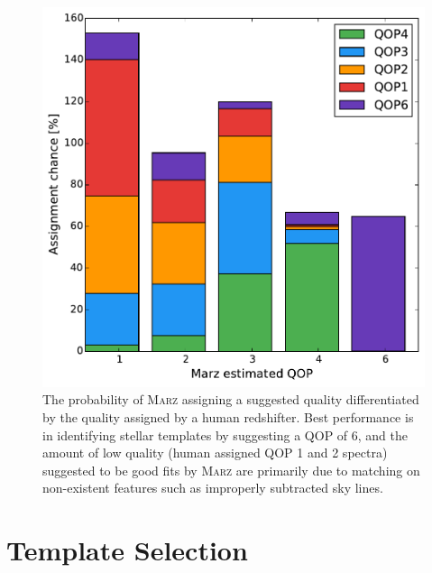 \documentclass[iop]{emulateapj}
\newcommand{\marz}{\textsc{Marz}}
\begin{document}
\begin{figure}[h]
\centering
\includegraphics[width=\columnwidth]{autoqop.pdf}
\caption{The probability of \marz{} assigning a suggested quality differentiated by the quality assigned by a human redshifter. Best performance is in identifying stellar templates by suggesting a QOP of 6, and the amount of low quality (human assigned QOP 1 and 2 spectra) suggested to be good fits by \marz{} are primarily due to matching on non-existent features such as improperly subtracted sky lines.}
\label{fig:autoqop}
\end{figure}




\section{Template Selection}
\end{document}
